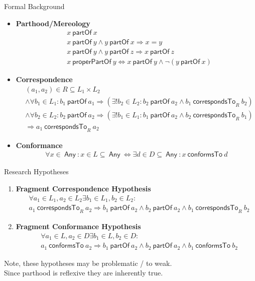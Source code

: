 \documentclass{beamer}
\newcommand{\partOf}{~\textsf{partOf}~}
\newcommand{\properPartOf}{~\textsf{properPartOf}~}
\newcommand{\Any}{~\textsf{Any}~}
\newcommand{\correspondsToR}[1]{~\textsf{correspondsTo}_{#1}~}
\newcommand{\conformsTo}{~\textsf{conformsTo}~}
\begin{document}
\begin{frame}{Formal Background}
\begin{itemize}
\item
\textbf{Parthood/Mereology}\cite{DBLP:conf/sle/Lammel16}\cite{DBLP:journals/dke/Varzi96}
{\scriptsize
\begin{align*}
&x \partOf x
\\&x \partOf y \wedge y \partOf x \Rightarrow x = y
\\&x \partOf y \wedge y \partOf z \Rightarrow x \partOf z
\\&x \properPartOf y \Leftrightarrow x \partOf y \wedge \neg(y \partOf x)
\end{align*}
}
\item
\textbf{Correspondence}\cite{DBLP:conf/sle/Lammel16}
{\scriptsize
\begin{align*}
&(a_1,a_2) \in R \subseteq L_1 \times L_2
\\&\wedge \forall b_1 \in L_1 : b_1 \partOf a_1 \Rightarrow (\exists! b_2 \in L_2 : b_2 \partOf a_2 \wedge b_1 \correspondsToR{R} b_2 )
\\&\wedge \forall b_2 \in L_2 : b_2 \partOf a_2 \Rightarrow (\exists! b_1 \in L_1 : b_1 \partOf a_2 \wedge b_2 \correspondsToR{R} b_1 )
\\&\Rightarrow a_1 \correspondsToR{R} a_2
\end{align*}
}
\item
\textbf{Conformance}\cite{DBLP:conf/sle/Lammel16}
{\scriptsize
\begin{align*}
\forall x \in \Any :
x \in L \subseteq \Any \Leftrightarrow \exists d \in D \subseteq \Any : x \conformsTo d
\end{align*}
}

\end{itemize}
\end{frame}

\begin{frame}{Research Hypotheses}
\begin{enumerate}[RH1]
\item
\textbf{Fragment Correspondence Hypothesis}
{\scriptsize
\begin{align*}
&\forall a_1 \in L_1, a_2 \in L_2 \exists b_1 \in L_1, b_2 \in L_2 :  
\\&a_1 \correspondsToR{R} a_2
\Rightarrow 
b_1 \partOf a_2 
\wedge b_2 \partOf a_2
\wedge b_1 \correspondsToR{R} b_2
\end{align*}
}
\item
\textbf{Fragment Conformance Hypothesis}
{\scriptsize
\begin{align*}
&\forall a_1 \in L, a_2 \in D \exists b_1 \in L, b_2 \in D : 
\\&a_1 \conformsTo a_2
\Rightarrow 
b_1 \partOf a_2
\wedge b_2 \partOf a_2
\wedge b_1 \conformsTo b_2
\end{align*}
}
\end{enumerate}
\begin{center}
\tiny
Note, these hypotheses may be problematic / to weak.
\\Since parthood is reflexive they are inherently true.
\end{center}
\end{frame}
\end{document}
